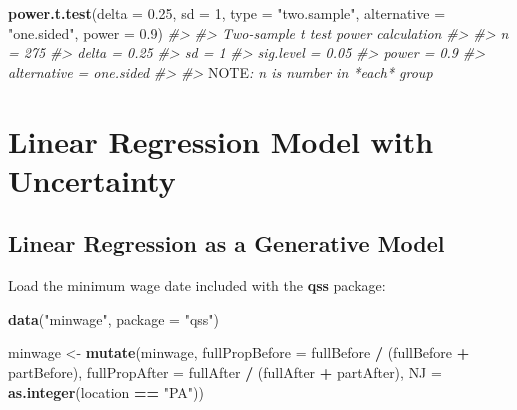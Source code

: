 \documentclass[]{book}
\newenvironment{Shaded}{\begin{snugshade}}{\end{snugshade}}
\newcommand{\KeywordTok}[1]{\textcolor[rgb]{0.13,0.29,0.53}{\textbf{#1}}}
\newcommand{\DataTypeTok}[1]{\textcolor[rgb]{0.13,0.29,0.53}{#1}}
\newcommand{\DecValTok}[1]{\textcolor[rgb]{0.00,0.00,0.81}{#1}}
\newcommand{\FloatTok}[1]{\textcolor[rgb]{0.00,0.00,0.81}{#1}}
\newcommand{\StringTok}[1]{\textcolor[rgb]{0.31,0.60,0.02}{#1}}
\newcommand{\CommentTok}[1]{\textcolor[rgb]{0.56,0.35,0.01}{\textit{#1}}}
\newcommand{\OperatorTok}[1]{\textcolor[rgb]{0.81,0.36,0.00}{\textbf{#1}}}
\newcommand{\AlertTok}[1]{\textcolor[rgb]{0.94,0.16,0.16}{#1}}
\newcommand{\NormalTok}[1]{#1}
\theoremstyle{definition}
\theoremstyle{definition}
\theoremstyle{definition}
\theoremstyle{remark}
\begin{document}
\begin{Shaded}
\begin{Highlighting}[]
\KeywordTok{power.t.test}\NormalTok{(}\DataTypeTok{delta =} \FloatTok{0.25}\NormalTok{, }\DataTypeTok{sd =} \DecValTok{1}\NormalTok{, }\DataTypeTok{type =} \StringTok{"two.sample"}\NormalTok{,}
             \DataTypeTok{alternative =} \StringTok{"one.sided"}\NormalTok{, }\DataTypeTok{power =} \FloatTok{0.9}\NormalTok{)}
\CommentTok{#> }
\CommentTok{#>      Two-sample t test power calculation }
\CommentTok{#> }
\CommentTok{#>               n = 275}
\CommentTok{#>           delta = 0.25}
\CommentTok{#>              sd = 1}
\CommentTok{#>       sig.level = 0.05}
\CommentTok{#>           power = 0.9}
\CommentTok{#>     alternative = one.sided}
\CommentTok{#> }
\CommentTok{#> }\AlertTok{NOTE}\CommentTok{: n is number in *each* group}
\end{Highlighting}
\end{Shaded}

\section{Linear Regression Model with
Uncertainty}\label{linear-regression-model-with-uncertainty}

\subsection{Linear Regression as a Generative
Model}\label{linear-regression-as-a-generative-model}

Load the minimum wage date included with the \textbf{qss} package:

\begin{Shaded}
\begin{Highlighting}[]
\KeywordTok{data}\NormalTok{(}\StringTok{"minwage"}\NormalTok{, }\DataTypeTok{package =} \StringTok{"qss"}\NormalTok{)}
\end{Highlighting}
\end{Shaded}

\begin{Shaded}
\begin{Highlighting}[]
\NormalTok{minwage <-}\StringTok{ }\KeywordTok{mutate}\NormalTok{(minwage,}
                  \DataTypeTok{fullPropBefore =}\NormalTok{ fullBefore }\OperatorTok{/}\StringTok{ }\NormalTok{(fullBefore }\OperatorTok{+}\StringTok{ }\NormalTok{partBefore),}
                  \DataTypeTok{fullPropAfter =}\NormalTok{ fullAfter }\OperatorTok{/}\StringTok{ }\NormalTok{(fullAfter }\OperatorTok{+}\StringTok{ }\NormalTok{partAfter),}
                  \DataTypeTok{NJ =} \KeywordTok{as.integer}\NormalTok{(location }\OperatorTok{==}\StringTok{ "PA"}\NormalTok{))}
\end{Highlighting}
\end{Shaded}
\end{document}
